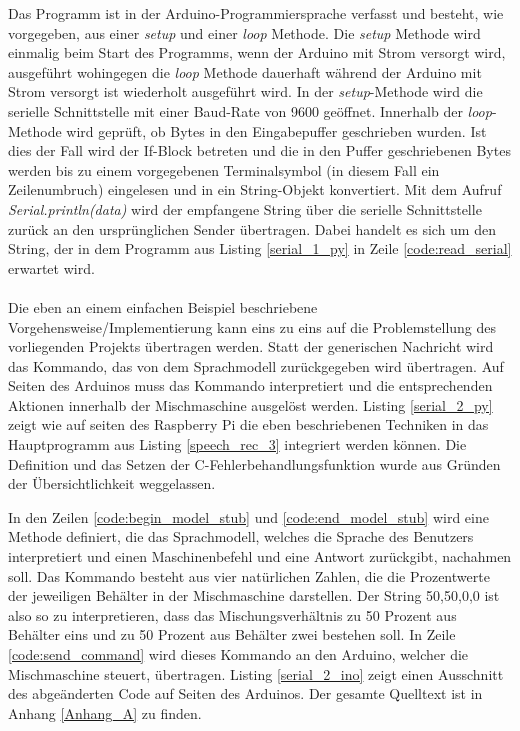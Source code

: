 
Das Programm ist in der Arduino-Programmiersprache verfasst und besteht, wie vorgegeben, aus einer \textit{setup} und einer \textit{loop} Methode. Die \textit{setup} Methode wird einmalig beim Start des Programms, wenn der Arduino mit Strom versorgt wird, ausgeführt wohingegen die \textit{loop} Methode dauerhaft während der Arduino mit Strom versorgt ist wiederholt ausgeführt wird. In der \textit{setup}-Methode wird die serielle Schnittstelle mit einer Baud-Rate von 9600 geöffnet. Innerhalb der \textit{loop}-Methode wird geprüft, ob Bytes in den Eingabepuffer geschrieben wurden. Ist dies der Fall wird der If-Block betreten und die in den Puffer geschriebenen Bytes werden bis zu einem vorgegebenen Terminalsymbol (in diesem Fall ein Zeilenumbruch) eingelesen und in ein String-Objekt konvertiert. Mit dem Aufruf \textit{Serial.println(data)} wird der empfangene String über die serielle Schnittstelle zurück an den ursprünglichen Sender übertragen. Dabei handelt es sich um den String, der in dem Programm aus Listing \ref{serial_1_py} in Zeile \ref{code:read_serial} erwartet wird.\\\\
Die eben an einem einfachen Beispiel beschriebene Vorgehensweise/Implementierung kann eins zu eins auf die Problemstellung des vorliegenden Projekts übertragen werden. Statt der generischen Nachricht wird das Kommando, das von dem Sprachmodell zurückgegeben wird übertragen. Auf Seiten des Arduinos muss das Kommando interpretiert und die entsprechenden Aktionen innerhalb der Mischmaschine ausgelöst werden. Listing \ref{serial_2_py} zeigt wie auf seiten des Raspberry Pi die eben beschriebenen Techniken in das Hauptprogramm aus Listing \ref{speech_rec_3} integriert werden können. Die Definition und das Setzen der C-Fehlerbehandlungsfunktion wurde aus Gründen der Übersichtlichkeit weggelassen.

In den Zeilen \ref{code:begin_model_stub} und \ref{code:end_model_stub} wird eine Methode definiert, die das Sprachmodell, welches die Sprache des Benutzers interpretiert und einen Maschinenbefehl und eine Antwort zurückgibt, nachahmen soll. Das Kommando besteht aus vier natürlichen Zahlen, die die Prozentwerte der jeweiligen Behälter in der Mischmaschine darstellen. Der String \glqq{}50,50,0,0\grqq{} ist also so zu interpretieren, dass das Mischungsverhältnis zu 50 Prozent aus Behälter eins und zu 50 Prozent aus Behälter zwei bestehen soll. In Zeile \ref{code:send_command} wird dieses Kommando an den Arduino, welcher die Mischmaschine steuert, übertragen. Listing \ref{serial_2_ino} zeigt einen Ausschnitt des abgeänderten Code auf Seiten des Arduinos. Der gesamte Quelltext ist in Anhang \ref{Anhang_A} zu finden.
